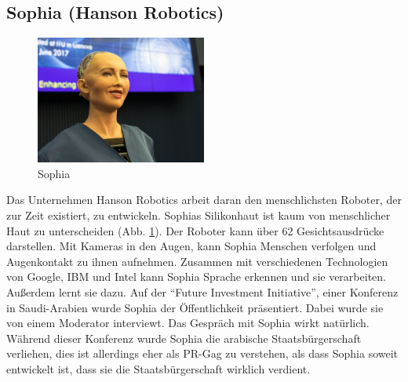 \subsection{Sophia (Hanson Robotics)}
\begin{figure}
  \centering
     \includegraphics[width=0.5\textwidth]{sophia}
  \caption{Sophia \cite{AbbildungSophia}}
  \label{fig:sophia}
\end{figure}
Das Unternehmen Hanson Robotics arbeit daran den menschlichsten Roboter, der zur
Zeit existiert, zu entwickeln. Sophias Silikonhaut ist kaum von menschlicher
Haut zu unterscheiden (Abb. \ref{fig:sophia}). Der Roboter kann über 62
Gesichtsausdrücke darstellen.
Mit Kameras in den Augen, kann Sophia Menschen verfolgen und Augenkontakt zu
ihnen aufnehmen. Zusammen mit verschiedenen Technologien von Google, IBM und
Intel kann Sophia Sprache erkennen und sie verarbeiten. Außerdem lernt sie
dazu. \cite{Harriet2016} Auf der "`Future Investment Initiative"', einer
Konferenz in Saudi-Arabien wurde Sophia der Öffentlichkeit präsentiert. Dabei
wurde sie von einem Moderator interviewt. Das Gespräch mit Sophia wirkt
natürlich. Während dieser Konferenz wurde Sophia die arabische
Staatsbürgerschaft verliehen, dies ist allerdings eher als PR-Gag zu verstehen,
als dass Sophia soweit entwickelt ist, dass sie die Staatsbürgerschaft wirklich
verdient. \cite{Welt2017}

